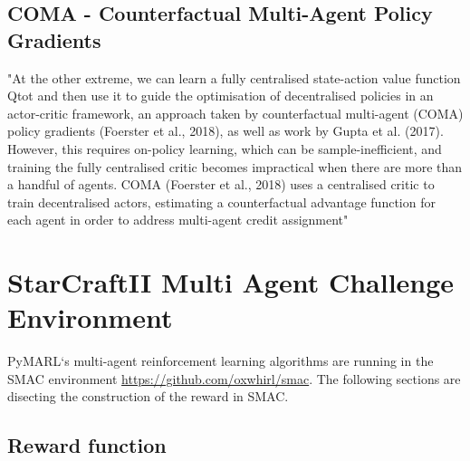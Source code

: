 
\subsection{COMA - Counterfactual Multi-Agent Policy Gradients}
\cite{foerster2017counterfactual}

"At the other extreme, we can learn a fully centralised state-action value function Qtot and then use it to guide the optimisation of decentralised policies in an actor-critic framework, an approach taken by counterfactual multi-agent
(COMA) policy gradients (Foerster et al., 2018), as well as work by Gupta et al. (2017). However, this requires on-policy learning, which can be sample-inefficient, and training the fully centralised critic becomes impractical when there are more than a handful of agents. COMA (Foerster et al., 2018) uses a centralised critic to train decentralised actors, estimating a counterfactual advantage function for each agent in order to address multi-agent credit assignment\cite{rashid2018qmix}"

\section{StarCraftII Multi Agent Challenge Environment}

PyMARL`s multi-agent reinforcement learning algorithms are running in the SMAC environment \url{https://github.com/oxwhirl/smac}. \cite{samvelyan19smac} The following sections are disecting the construction of the reward in SMAC.

\subsection{Reward function}

